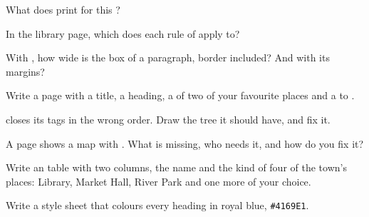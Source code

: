 \begin{exercise}[$\star$]\label{exo:g9:html-and-css:1}
What does  print for this ?

\smallskip\centerline{}
\end{exercise}

\begin{exercise}[$\star$]\label{exo:g9:html-and-css:2}
In the library page, which  does each rule of 
apply to?
\end{exercise}

\begin{exercise}[$\star$]\label{exo:g9:html-and-css:3}
With , how wide is the box of a paragraph, border
included? And with its margins?
\end{exercise}

\begin{exercise}[$\star$]\label{exo:g9:html-and-css:4}
Write a page with a title, a heading, a  of two of your favourite places
and a  to .
\end{exercise}

\begin{exercise}[$\star\star$]\label{exo:g9:html-and-css:5}
 closes its tags in the wrong order.
Draw the tree it should have, and fix it.
\end{exercise}

\begin{exercise}[$\star\star$]\label{exo:g9:html-and-css:6}
A page shows a map with . What is missing, who
needs it, and how do you fix it?
\end{exercise}

\begin{exercise}[$\star\star$]\label{exo:g9:html-and-css:7}
Write an  table with two columns, the name and the kind of four of the
town's places: Library, Market Hall, River Park and one more of your choice.
\end{exercise}

\begin{exercise}[$\star\star$]\label{exo:g9:html-and-css:8}
Write a style sheet that colours every  heading in royal blue,
\texttt{\#4169E1}.
\end{exercise}

